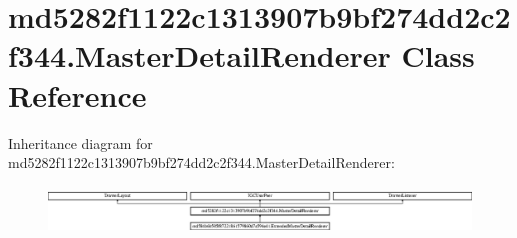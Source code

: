 \hypertarget{classmd5282f1122c1313907b9bf274dd2c2f344_1_1MasterDetailRenderer}{}\section{md5282f1122c1313907b9bf274dd2c2f344.\+Master\+Detail\+Renderer Class Reference}
\label{classmd5282f1122c1313907b9bf274dd2c2f344_1_1MasterDetailRenderer}
Inheritance diagram for md5282f1122c1313907b9bf274dd2c2f344.\+Master\+Detail\+Renderer\+:\begin{figure}[H]
\begin{center}
\leavevmode
\includegraphics[height=1.261261cm]{classmd5282f1122c1313907b9bf274dd2c2f344_1_1MasterDetailRenderer}
\end{center}
\end{figure}
